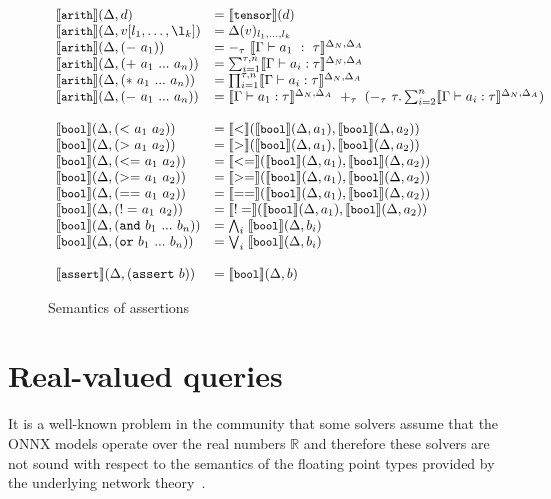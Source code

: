 \begin{figure}
\newcommand{\semComp}[1]{\semBool{(\mathtt{#1}~a_1~a_2)}
    &= \sem{#1}(\semBool{a_1},\semBool{a_2})}
 
\begin{equation*}
\begin{array}{llll}
    \semArith{d}
    &= \semTensor(d)
    \\
    \semArith{v[l_1, \ldots, \l_k]} 
    &= \assertEnv(v)_{l_1, \ldots, l_k} 
    \\
    \semArith{({\mathtt{-}}~a_1)}
    &= -_\tau~\semenv{\Gamma\vdash{a_1}~:~\tau} 
    \\
    \semArith{(\mathtt{+}~a_1~...~a_n)} 
    &= \sum^{\tau, n}_{i=1}\semenv{\Gamma\vdash{a_i}:\tau} 
    \\
    \semArith{(\mathtt{*}~a_1~...~a_n)} 
    &= \prod^{\tau, n}_{i=1}\semenv{\Gamma\vdash{a_i}:\tau} 
    \\
    \semArith{(\mathtt{-}~a_1~...~a_n)} 
    &= \semenv{\Gamma\vdash{a_1}:\tau}~+_\tau~(-_\tau~\tau.\sum^{n}_{i=2}\semenv{\Gamma\vdash{a_i}:\tau}) 
    \\
    \\
    \semComp{<}
    \\
    \semComp{>}
    \\
    \semComp{<=}
    \\
    \semComp{>=}
    \\
    \semComp{==}
    \\
    \semComp{!=}
    \\
    \semBool{(\mathtt{and}~b_1~...~b_n)} &=\bigwedge_{i} \;\semBool{b_i}\\
    \semBool{(\mathtt{or}~b_1~...~b_n)} &=\bigvee_{i} \; \semBool{b_i}
    \\
    \\
    \semAssert{(\mathtt{assert}~b)} &= \semBool{b}
\end{array}
\end{equation*}
\caption{Semantics of \vnnlib{} assertions}
\end{figure}


\section{Real-valued queries}

It is a well-known problem in the community that some solvers assume that the ONNX models operate over the real numbers $\mathbb{R}$ and therefore these solvers are not sound with respect to the semantics of the floating point types provided by the underlying network theory~\cite{jia2021exploiting}. 

